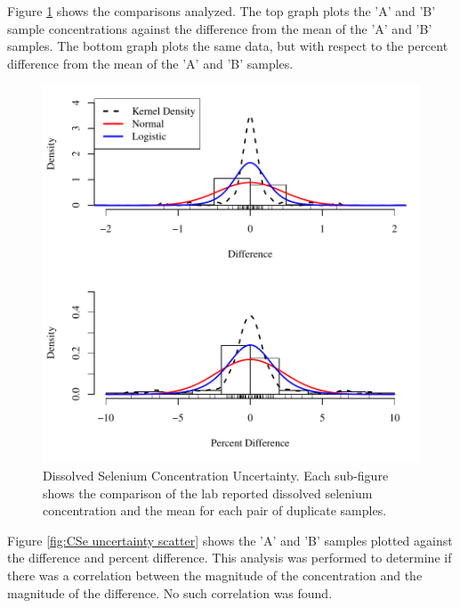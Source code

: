 \begin{linenumbers}
Figure \ref{fig:CSe uncertainty} shows the comparisons analyzed.  The top graph plots the 'A' and 'B' sample concentrations against the difference from the mean of the 'A' and 'B' samples.  The bottom graph plots the same data, but with respect to the percent difference from the mean of the 'A' and 'B' samples.
\begin{figure}[htbp]
	\begin{center}
		\includegraphics[width=6in]{"Figures/Results_USR/Stochastic/CSe Error"}
		\caption[Dissolved Selenium Concentration Uncertainty.]{Dissolved Selenium Concentration Uncertainty.  Each sub-figure shows the comparison of the lab reported dissolved selenium concentration and the mean for each pair of duplicate samples.}
		\label{fig:CSe uncertainty}
	\end{center}
\end{figure}

Figure \ref{fig:CSe uncertainty scatter} shows the 'A' and 'B' samples plotted against the difference and percent difference.  This analysis was performed to determine if there was a correlation between the magnitude of the concentration and the magnitude of the difference.  No such correlation was found.


\end{linenumbers}
